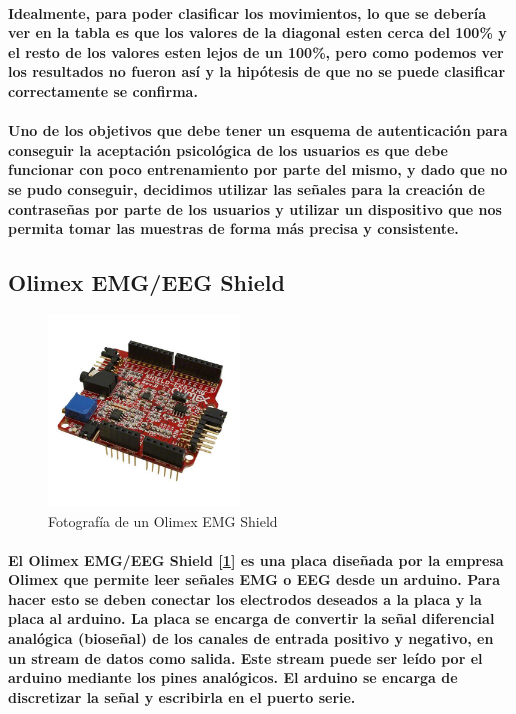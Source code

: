 \documentclass{article}
\begin{document}
\paragraph{
Idealmente, para poder clasificar los movimientos, lo que se debería ver en la tabla es que los valores de la diagonal esten cerca del 100\% y el resto de los valores esten lejos de un 100\%, pero como podemos ver los resultados no fueron así y la hipótesis de que no se puede clasificar correctamente se confirma.
}
\paragraph{
Uno de los objetivos que debe tener un esquema de autenticación para conseguir la aceptación psicológica de los usuarios es que debe funcionar con poco entrenamiento por parte del mismo, y dado que no se pudo conseguir, decidimos utilizar las señales para la creación de contraseñas por parte de los usuarios y utilizar un dispositivo que nos permita tomar las muestras de forma más precisa y consistente.
}

\subsection{Olimex EMG/EEG Shield}

\begin{figure}[ht]
    \centering
    \includegraphics[width=2in]{SHIELD-EKG-EMG.jpg}%
    \caption{Fotografía de un Olimex EMG Shield}
    \label{fig:olimexshield}
\end{figure}

\paragraph{
El Olimex EMG/EEG Shield [\ref{fig:olimexshield}] es una placa diseñada por la empresa Olimex que permite leer señales EMG o EEG desde un arduino. Para hacer esto se deben conectar los electrodos deseados a la placa y la placa al arduino. La placa se encarga de convertir la señal diferencial analógica (bioseñal) de los canales de entrada positivo y negativo, en un stream de datos como salida. Este stream puede ser leído por el arduino mediante los pines analógicos. El arduino se encarga de discretizar la señal y escribirla en el puerto serie.
}
\end{document}
